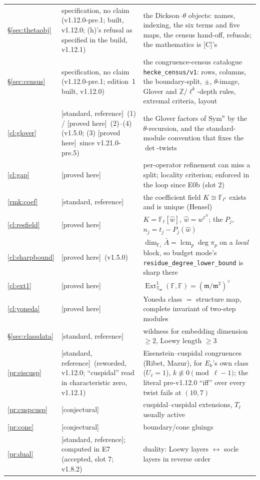 \documentclass[11pt]{article}
\theoremstyle{remark}
\newcommand{\F}{\mathbb{F}}
\newcommand{\Z}{\mathbb{Z}}
\newcommand{\Sym}{\mathrm{Sym}}
\newcommand{\Fl}{\F_\ell}
\newcommand{\Flr}{\F_{\ell^r}}
\DeclareMathOperator{\Ext}{Ext}
\newcommand{\T}{\mathbb{T}}
\newcommand{\m}{\mathfrak{m}}
\newcommand{\PROVED}{\textsf{[proved here]}}
\newcommand{\STD}{\textsf{[standard, reference]}}
\newcommand{\CONJ}{\textsf{[conjectural]}}
\begin{document}
\begin{center}
\begin{longtable}{@{}l>{\raggedright\arraybackslash}p{3.6cm}>{\raggedright\arraybackslash}p{10.6cm}@{}}
\S\ref{sec:thetaobj} & specification, no claim (v1.12.0-pre.1; built, v1.12.0; (h)'s refusal as specified in the build, v1.12.1) & the Dickson--$\theta$ objects: names, indexing, the six terms and five maps, the census hand-off, refusals; the mathematics is [C]'s \\
\S\ref{sec:census} & specification, no claim (v1.12.0-pre.1; edition~1 built, v1.12.0) & the congruence-census catalogue \texttt{hecke\_census/v1}: rows, columns, the boundary-split, $\pm$, $\theta$-image, Glover and $\Z/\ell^k$-depth rules, extremal criteria, layout \\
\ref{cl:glover} & \STD\ (1) / \PROVED\ (2)--(4) (v1.5.0; (3) \PROVED\ since v1.21.0-pre.5) & the Glover factors of $\Sym^n$ by the $\theta$-recursion, and the standard-module convention that fixes the $\det$-twists \\
\ref{cl:gap} & \PROVED & per-operator refinement can miss a split; locality criterion; enforced in the loop since E0b (slot 2) \\
\ref{rmk:coef} & \STD & the coefficient field $K\cong\Flr$ exists and is unique (Hensel) \\
\ref{cl:resfield} & \PROVED & $K=\Fl[\hat w]$, $\hat w=w^{\ell^N}$; the $P_j$, $n_j=t_j-P_j(\hat w)$ \\
\ref{cl:sharpbound} & \PROVED\ (v1.5.0) & $\dim_{\Fl}\bar A=\operatorname{lcm}_p\deg\pi_p$ on a \emph{local} block, so budget mode's \texttt{residue\_degree\_lower\_bound} is sharp there \\
\ref{cl:ext1} & \PROVED & $\Ext^1_{\T_\m}(\F,\F)=(\m/\m^2)^\vee$ \\
\ref{cl:yoneda} & \PROVED & Yoneda class $=$ structure map, complete invariant of two-step modules \\
\S\ref{sec:classdata} & \STD & wildness for embedding dimension $\ge2$, Loewy length $\ge3$ \\
\ref{pr:eiscusp} & \STD\ (reworded, v1.12.0; ``cuspidal'' read in characteristic zero, v1.12.1) & Eisenstein--cuspidal congruences (Ribet, Mazur), for $E_k$'s own class ($U_\ell=1$), $k\not\equiv0\pmod{\ell-1}$; the literal pre-v1.12.0 ``iff'' over every twist fails at $(10,7)$ \\
\ref{pr:cuspcusp} & \CONJ & cuspidal--cuspidal extensions, $T_\ell$ usually active \\
\ref{pr:cone} & \CONJ & boundary/cone gluings \\
\ref{pr:dual} & \STD; computed in E7 (accepted, slot 7; v1.8.2) & duality: Loewy layers $\leftrightarrow$ socle layers in reverse order \\

\end{longtable}
\end{center}
\end{document}
